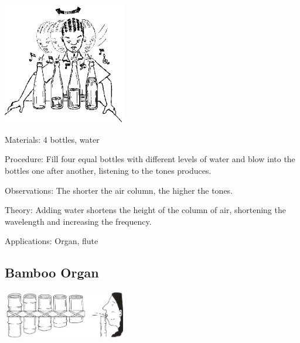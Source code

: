 \begin{multicols}{2}
\begin{center}
\includegraphics[width=0.4\textwidth]{./img/source/bottle-orchestra.png}
\end{center}

\begin{description*}
\item[Materials:]{4 bottles, water}
\item[Procedure:]{Fill four equal bottles with different levels of water and blow into the bottles one after another, listening to the tones produces.}
\item[Observations:]{The shorter the air column, the higher the tones.}
\item[Theory:]{Adding water shortens the height of the column of air, shortening the wavelength and increasing the frequency.}
\item[Applications:]{Organ, flute}
\end{description*}

\subsection{Bamboo Organ}

\begin{center}
\includegraphics[width=0.4\textwidth]{./img/vso/bamboo-organ.png}
\end{center}


\end{multicols}
